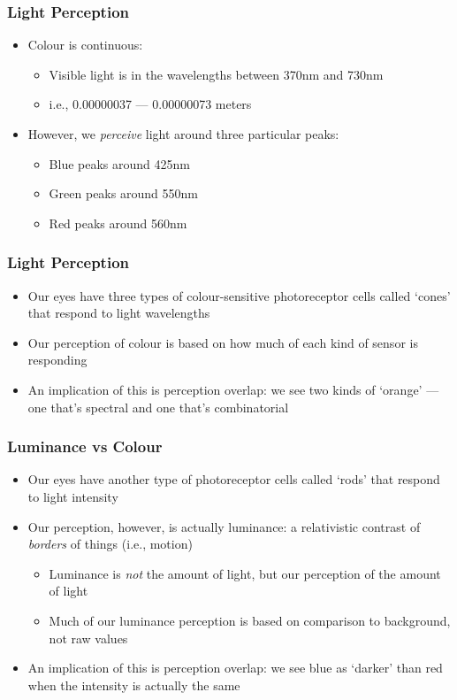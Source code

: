 \begin{frame}
	\frametitle{Light Perception}
	\begin{itemize}
		\item Colour is continuous:
		\begin{itemize}
			\item Visible light is in the wavelengths between 370nm and 730nm
			\item i.e., 0.00000037 --- 0.00000073 meters
		\end{itemize}
		\item However, we \textit{perceive} light around three particular peaks:
		\begin{itemize}
			\item Blue peaks around 425nm
			\item Green peaks around 550nm
			\item Red peaks around 560nm
		\end{itemize}
	\end{itemize}
\end{frame}

\begin{frame}
	\frametitle{Light Perception}
	\begin{itemize}
		\item Our eyes have three types of colour-sensitive photoreceptor cells called `cones' that respond to light wavelengths
		\item Our perception of colour is based on how much of each kind of sensor is responding
		\item An implication of this is perception overlap: we see two kinds of `orange' --- one that's spectral and one that's combinatorial
	\end{itemize}
\end{frame}


\begin{frame}
	\frametitle{Luminance vs Colour}
	\begin{itemize}
		\item Our eyes have another type of photoreceptor cells called `rods' that respond to light intensity
		\item Our perception, however, is actually luminance: a relativistic contrast of \textit{borders} of things (i.e., motion) 
		\begin{itemize}
			\item Luminance is \textit{not} the amount of light, but our perception of the amount of light
			\item Much of our luminance perception is based on comparison to background, not raw values
		\end{itemize}
		\item An implication of this is perception overlap: we see blue as `darker' than red when the intensity is actually the same
	\end{itemize}
\end{frame}

